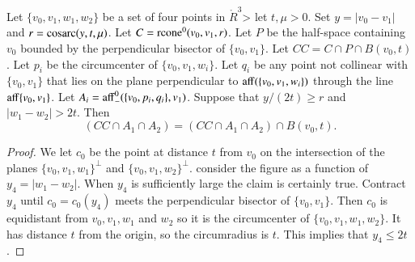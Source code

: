 \begin{tarskidata}
\begin{tarski}

\begin{lemma}
Let $\{v_0,v_1,w_1,w_2\}$ be a set of four points in $\ring{R}^3$>
let $t,\mu > 0$.  Set $y=|v_0-v_1|$
and $r={\operatorname{cosarc}}(y,t,\mu)$.
Let $C={\operatorname{rcone}}^0(v_0,v_1,r)$.
Let $P$ be the half-space containing $v_0$ bounded by
the perpendicular bisector of  $\{v_0,v_1\}$.
Let $CC = C\cap P \cap B(v_0,t)$. %
Let $p_i$ be the circumcenter of $\{v_0,v_1,w_i\}$.  Let
$q_i$ be any point not collinear with $\{v_0,v_1\}$ that
lies on the plane perpendicular to ${\operatorname{aff}}(\{v_0,v_1,w_i\})$
through the line ${\operatorname{aff}}\{v_0,v_1\}$.
Let $A_i = {\operatorname{aff}}_-^0(\{v_0,p_i,q_i\},v_1)$.
Suppose that $y/(2t) \ge r$ and $|w_1-w_2| > 2t$.
Then
  $$
  (CC \cap A_1\cap A_2) =   (CC \cap A_1\cap A_2) \cap B(v_0,t).
  $$
\end{lemma}



\begin{proof}
We let $c_0$ be the point at distance $t$ from $v_0$ 
on the intersection of the
planes $\{v_0,v_1,w_1\}^\perp$ and $\{v_0,v_1,w_2\}^\perp$. 
consider the figure as a function of $y_4=|w_1-w_2|$. When $y_4$ is
sufficiently large the claim is certainly true.  Contract $y_4$ until
$c_0=c_0(y_4)$ meets the perpendicular bisector of $\{v_0,v_1\}$. Then $c_0$
is equidistant from $v_0,v_1,w_1$ and $w_2$ so it is the circumcenter of
$\{v_0,v_1,w_1,w_2\}$. It has distance $t$ from the origin, so the
circumradius is $t$. This implies that $y_4\le 2t$.
\end{proof}
\end{tarski}






\begin{tarski}


\end{tarski}
\end{tarskidata}
